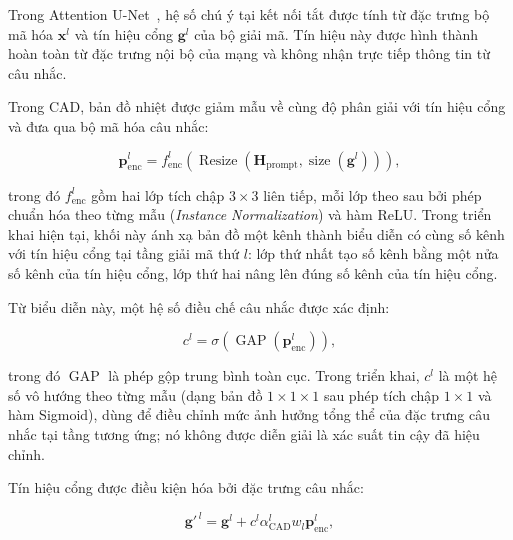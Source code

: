 Trong Attention U-Net~\cite{oktay2018attentionunet}, hệ số chú ý tại kết nối tắt được tính từ đặc trưng bộ mã hóa $\mathbf{x}^{l}$ và tín hiệu cổng $\mathbf{g}^{l}$ của bộ giải mã. Tín hiệu này được hình thành hoàn toàn từ đặc trưng nội bộ của mạng và không nhận trực tiếp thông tin từ câu nhắc.

Trong CAD, bản đồ nhiệt được giảm mẫu về cùng độ phân giải với tín hiệu cổng và đưa qua bộ mã hóa câu nhắc:

\begin{equation}
    \mathbf{p}^{l}_{\mathrm{enc}}
    =
    f^{l}_{\mathrm{enc}}
    \left(
        \operatorname{Resize}
        \left(
            \mathbf{H}_{\mathrm{prompt}},
            \operatorname{size}(\mathbf{g}^{l})
        \right)
    \right),
    \label{eq:prompt_encoding}
\end{equation}

trong đó $f^{l}_{\mathrm{enc}}$ gồm hai lớp tích chập $3\times3$ liên tiếp, mỗi lớp theo sau bởi phép chuẩn hóa theo từng mẫu (\textit{Instance Normalization}) và hàm ReLU. Trong triển khai hiện tại, khối này ánh xạ bản đồ một kênh thành biểu diễn có cùng số kênh với tín hiệu cổng tại tầng giải mã thứ $l$: lớp thứ nhất tạo số kênh bằng một nửa số kênh của tín hiệu cổng, lớp thứ hai nâng lên đúng số kênh của tín hiệu cổng.

Từ biểu diễn này, một hệ số điều chế câu nhắc được xác định:

\begin{equation}
    c^{l}
    =
    \sigma
    \left(
        \operatorname{GAP}
        \left(
            \mathbf{p}^{l}_{\mathrm{enc}}
        \right)
    \right),
    \label{eq:prompt_confidence}
\end{equation}

trong đó $\operatorname{GAP}$ là phép gộp trung bình toàn cục. Trong triển khai, $c^{l}$ là một hệ số vô hướng theo từng mẫu (dạng bản đồ $1\times1\times1$ sau phép tích chập $1\times1$ và hàm Sigmoid), dùng để điều chỉnh mức ảnh hưởng tổng thể của đặc trưng câu nhắc tại tầng tương ứng; nó không được diễn giải là xác suất tin cậy đã hiệu chỉnh.

Tín hiệu cổng được điều kiện hóa bởi đặc trưng câu nhắc:

\begin{equation}
    \mathbf{g}'^{\,l}
    =
    \mathbf{g}^{l}
    +
    c^{l}
    \alpha^{l}_{\mathrm{CAD}}
    w_l
    \mathbf{p}^{l}_{\mathrm{enc}},
    \label{eq:conditioned_gate}
\end{equation}


